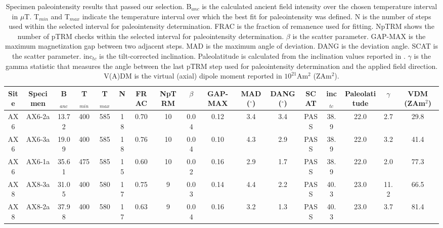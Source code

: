 \documentclass[9pt,twoside]{pnas-new}
\begin{document}
\clearpage

\begin{table}
\caption{\footnotesize{Specimen paleointensity results that passed our selection. B$_{anc}$ is the calculated ancient field intensity over the chosen temperature interval in $\mu$T. T$_{min}$ and T$_{max}$ indicate the temperature interval over which the best fit for paleointensity was defined. N is the number of steps used within the selected interval for paleointensity determination. FRAC is the fraction of remanence used for fitting. NpTRM shows the number of pTRM checks within the selected interval for paleointensity determination. $\beta$ is the scatter parameter. GAP-MAX is the maximum magnetization gap between two adjacent steps. MAD is the maximum angle of deviation. DANG is the deviation angle. SCAT is the scatter parameter. inc$_{tc}$ is the tilt-corrected inclination. Paleolatitude is calculated from the inclination values reported in \cite{Zhang2021b}. $\gamma$ is the gamma statistic that measures the angle between the last pTRM step used for paleointensity determination and the applied field direction. V(A)DM is the virtual (axial) dipole moment reported in $10^{21}$Am$^2$ (ZAm$^2$). }}
\centering
\begin{tabular}{ccccccccccccccccc}
\hline
Site & Specimen & B$_{anc}$ & T$_{min}$ & T$_{max}$ & N  & FRAC & NpTRM & $\beta$ & GAP-MAX & MAD ($^\circ$) & DANG ($^\circ$) & SCAT & inc$_{tc}$ & Paleolatitude & $\gamma$ & VDM (ZAm$^2$) \\
\hline
AX6  & AX6-2a   & 13.72     & 400       & 585       & 18 & 0.70 & 10    & 0.04    & 0.12    & 3.4            & 3.4             & PASS & 38.9       & 22.0          & 2.7      & 29.8          \\
AX6  & AX6-3a   & 19.09     & 400       & 585       & 18 & 0.76 & 10    & 0.04    & 0.10    & 4.3            & 2.9             & PASS & 38.9       & 22.0          & 3.2      & 41.4          \\
AX6  & AX6-1a   & 35.61     & 475       & 585       & 15 & 0.60 & 10    & 0.02    & 0.16    & 2.9            & 1.7             & PASS & 38.9       & 22.0          & 2.0      & 77.3          \\
AX8  & AX8-3a   & 31.05     & 400       & 580       & 17 & 0.75 & 9     & 0.03    & 0.14    & 4.4            & 2.2             & PASS & 40.3       & 23.0          & 11.2     & 66.5          \\
AX8  & AX8-2a   & 37.98     & 400       & 580       & 17 & 0.63 & 9     & 0.04    & 0.16    & 3.2            & 1.3             & PASS & 40.3       & 23.0          & 3.7      & 81.4          \\

\end{tabular}
\end{table}
\end{document}
